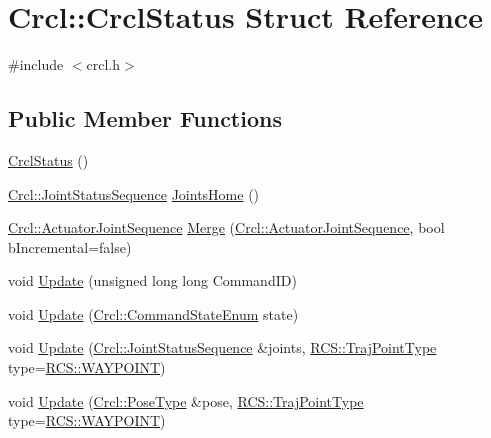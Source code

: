 \hypertarget{structCrcl_1_1CrclStatus}{\section{Crcl\-:\-:Crcl\-Status Struct Reference}
\label{structCrcl_1_1CrclStatus}
}


{\ttfamily \#include $<$crcl.\-h$>$}

\subsection*{Public Member Functions}
\begin{DoxyCompactItemize}
\item 
\hyperlink{structCrcl_1_1CrclStatus_a1cd41778adfbcbf93acf69b4696ca690}{Crcl\-Status} ()
\item 
\hyperlink{namespaceCrcl_a8e2d423195eeffb85b45b63f595f2825}{Crcl\-::\-Joint\-Status\-Sequence} \hyperlink{structCrcl_1_1CrclStatus_ad7e716027dc6c885675ff2016f36786b}{Joints\-Home} ()
\item 
\hyperlink{namespaceCrcl_af084766e8e2d38a135cc67ef54d9904d}{Crcl\-::\-Actuator\-Joint\-Sequence} \hyperlink{structCrcl_1_1CrclStatus_ae9eaeee83f8d6742d8e1d0f69f4d6e45}{Merge} (\hyperlink{namespaceCrcl_af084766e8e2d38a135cc67ef54d9904d}{Crcl\-::\-Actuator\-Joint\-Sequence}, bool b\-Incremental=false)
\item 
void \hyperlink{structCrcl_1_1CrclStatus_a50e2821837a7a50b50df2260435f9917}{Update} (unsigned long long Command\-I\-D)
\item 
void \hyperlink{structCrcl_1_1CrclStatus_a6aa15c7d9c21c17cc591a141a52bae15}{Update} (\hyperlink{namespaceCrcl_a5b3aa14f2f4ed63cc67ecba8eaab5c93}{Crcl\-::\-Command\-State\-Enum} state)
\item 
void \hyperlink{structCrcl_1_1CrclStatus_a86850bfee0203804c2cf8fd9e89ed33f}{Update} (\hyperlink{namespaceCrcl_a8e2d423195eeffb85b45b63f595f2825}{Crcl\-::\-Joint\-Status\-Sequence} \&joints, \hyperlink{namespaceRCS_ae705dbb4b887b18fef40316b6d5ca2c9}{R\-C\-S\-::\-Traj\-Point\-Type} type=\hyperlink{namespaceRCS_ae705dbb4b887b18fef40316b6d5ca2c9a255760a7e92a5d130681fc75e280cb61}{R\-C\-S\-::\-W\-A\-Y\-P\-O\-I\-N\-T})
\item 
void \hyperlink{structCrcl_1_1CrclStatus_ad538ccbf9fe6448b9c97c5ae79d6f818}{Update} (\hyperlink{namespaceCrcl_acc6c82b52280f4d0e74b82a92400956e}{Crcl\-::\-Pose\-Type} \&pose, \hyperlink{namespaceRCS_ae705dbb4b887b18fef40316b6d5ca2c9}{R\-C\-S\-::\-Traj\-Point\-Type} type=\hyperlink{namespaceRCS_ae705dbb4b887b18fef40316b6d5ca2c9a255760a7e92a5d130681fc75e280cb61}{R\-C\-S\-::\-W\-A\-Y\-P\-O\-I\-N\-T})

\end{DoxyCompactItemize}
